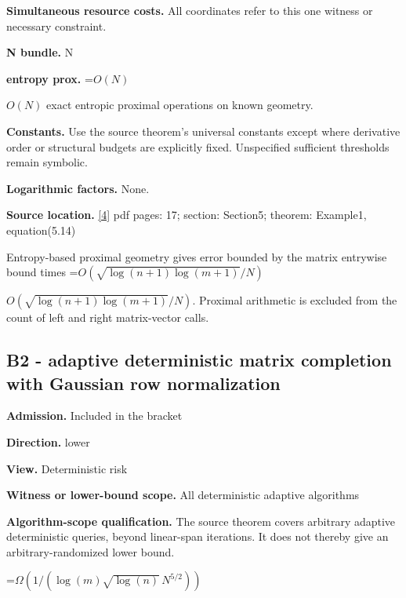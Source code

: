 \documentclass[10pt,a4paper]{article}
\newcommand{\AtlasMath}[1]{\par\begingroup\centering\setbox0=\hbox{$\displaystyle #1$}\ifdim\wd0>1.4\linewidth\typeout{ATLAS WIDE FORMULA: \the\wd0}\fi\ifdim\wd0>\linewidth\resizebox{\linewidth}{!}{\box0}\else\box0\fi\par\endgroup}
\newcommand{\AtlasInlineMath}[1]{\begingroup\setbox0=\hbox{$#1$}\ifdim\wd0>.4\linewidth\endgroup\AtlasMath{#1}\else\endgroup$#1$\fi}
\begin{document}
\textbf{Simultaneous resource costs.} All coordinates refer to this one witness or necessary constraint.



\textbf{N bundle.} N



\textbf{entropy prox.} \AtlasInlineMath{O(N)} exact entropic proximal operations on known geometry.



\textbf{Constants.} Use the source theorem’s universal constants except where derivative order or structural budgets are explicitly fixed. Unspecified sufficient thresholds remain symbolic.



\textbf{Logarithmic factors.} None.



\textbf{Source location.} \href{https://www2.isye.gatech.edu/~nemirovs/SIOPT_MP_2004.pdf}{[4]} pdf pages: 17; section: Section5; theorem: Example1, equation(5.14)



Entropy-based proximal geometry gives error bounded by the matrix entrywise bound times \AtlasInlineMath{O(\sqrt{\log(n+1)\log(m+1)}/N)}. Proximal arithmetic is excluded from the count of left and right matrix-vector calls.



\subsection{B2 - adaptive deterministic matrix completion with Gaussian row normalization}


\textbf{Admission.} Included in the bracket



\textbf{Direction.} lower



\textbf{View.} Deterministic risk



\textbf{Witness or lower-bound scope.} All deterministic adaptive algorithms



\textbf{Algorithm-scope qualification.} The source theorem covers arbitrary adaptive deterministic queries, beyond linear-span iterations. It does not thereby give an arbitrary-randomized lower bound.



\AtlasMath{\Omega(1/(\log(m)\sqrt{\log(n)}\,N^{5/2}))}
\end{document}
